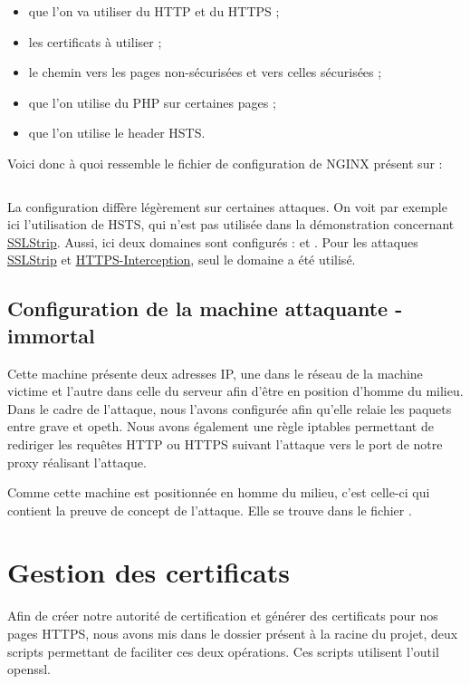 \begin{itemize}
\item que l'on va utiliser du HTTP et du HTTPS ;
\item les certificats à utiliser ;
\item le chemin vers les pages non-sécurisées et vers celles sécurisées ;
\item que l'on utilise du PHP sur certaines pages ;
\item que l'on utilise le header HSTS.
\end{itemize}

Voici donc à quoi ressemble le fichier de configuration de NGINX présent sur  :

\inputminted[bgcolor=lbcolor, breaklines]{shell}{../sslstrip2/opeth/nginx.conf}

La configuration diffère légèrement sur certaines attaques. On voit par exemple ici l'utilisation de HSTS, qui n'est pas utilisée dans la démonstration concernant \hyperref[sec:sslstrip]{SSLStrip}. Aussi, ici deux domaines sont configurés :  et . Pour les attaques \hyperref[sec:sslstrip]{SSLStrip} et \hyperref[sec:https-interception]{HTTPS-Interception}, seul le domaine  a été utilisé.

\subsection{Configuration de la machine attaquante - immortal}

Cette machine présente deux adresses IP, une dans le réseau de la machine victime et l'autre dans celle du serveur afin d'être en position d'homme du milieu. Dans le cadre de l'attaque, nous l'avons configurée afin qu'elle relaie les paquets entre grave et opeth. Nous avons également une règle iptables permettant de rediriger les requêtes HTTP ou HTTPS suivant l'attaque vers le port de notre proxy réalisant l'attaque.

Comme cette machine est positionnée en homme du milieu, c'est celle-ci qui contient la preuve de concept de l'attaque. Elle se trouve dans le fichier .

\section{Gestion des certificats}

\label{sec:certificats}

Afin de créer notre autorité de certification et générer des certificats pour nos pages HTTPS, nous avons mis dans le dossier  présent à la racine du projet, deux scripts permettant de faciliter ces deux opérations. Ces scripts utilisent l'outil openssl.


